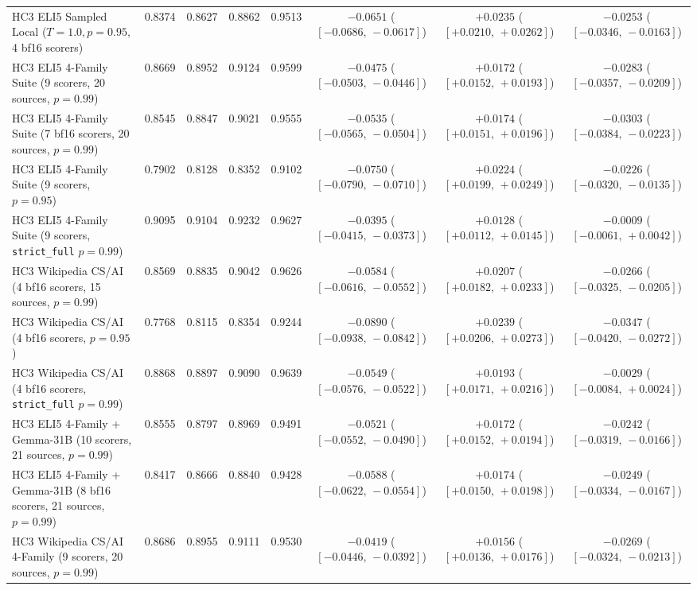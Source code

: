 \documentclass[11pt]{article}
\begin{document}
\begin{table}[t]
{\begin{tabular}{lccccccc}
HC3 ELI5 Sampled Local ($T=1.0, p=0.95$, 4 bf16 scorers) & 0.8374 & 0.8627 & 0.8862 & 0.9513 & $-0.0651$ ($[-0.0686,\,-0.0617]$) & $+0.0235$ ($[+0.0210,\,+0.0262]$) & $-0.0253$ ($[-0.0346,\,-0.0163]$) \\
HC3 ELI5 4-Family Suite (9 scorers, 20 sources, $p=0.99$) & 0.8669 & 0.8952 & 0.9124 & 0.9599 & $-0.0475$ ($[-0.0503,\,-0.0446]$) & $+0.0172$ ($[+0.0152,\,+0.0193]$) & $-0.0283$ ($[-0.0357,\,-0.0209]$) \\
HC3 ELI5 4-Family Suite (7 bf16 scorers, 20 sources, $p=0.99$) & 0.8545 & 0.8847 & 0.9021 & 0.9555 & $-0.0535$ ($[-0.0565,\,-0.0504]$) & $+0.0174$ ($[+0.0151,\,+0.0196]$) & $-0.0303$ ($[-0.0384,\,-0.0223]$) \\
HC3 ELI5 4-Family Suite (9 scorers, $p=0.95$) & 0.7902 & 0.8128 & 0.8352 & 0.9102 & $-0.0750$ ($[-0.0790,\,-0.0710]$) & $+0.0224$ ($[+0.0199,\,+0.0249]$) & $-0.0226$ ($[-0.0320,\,-0.0135]$) \\
HC3 ELI5 4-Family Suite (9 scorers, \texttt{strict\_full} $p=0.99$) & 0.9095 & 0.9104 & 0.9232 & 0.9627 & $-0.0395$ ($[-0.0415,\,-0.0373]$) & $+0.0128$ ($[+0.0112,\,+0.0145]$) & $-0.0009$ ($[-0.0061,\,+0.0042]$) \\
HC3 Wikipedia CS/AI (4 bf16 scorers, 15 sources, $p=0.99$) & 0.8569 & 0.8835 & 0.9042 & 0.9626 & $-0.0584$ ($[-0.0616,\,-0.0552]$) & $+0.0207$ ($[+0.0182,\,+0.0233]$) & $-0.0266$ ($[-0.0325,\,-0.0205]$) \\
HC3 Wikipedia CS/AI (4 bf16 scorers, $p=0.95$) & 0.7768 & 0.8115 & 0.8354 & 0.9244 & $-0.0890$ ($[-0.0938,\,-0.0842]$) & $+0.0239$ ($[+0.0206,\,+0.0273]$) & $-0.0347$ ($[-0.0420,\,-0.0272]$) \\
HC3 Wikipedia CS/AI (4 bf16 scorers, \texttt{strict\_full} $p=0.99$) & 0.8868 & 0.8897 & 0.9090 & 0.9639 & $-0.0549$ ($[-0.0576,\,-0.0522]$) & $+0.0193$ ($[+0.0171,\,+0.0216]$) & $-0.0029$ ($[-0.0084,\,+0.0024]$) \\
HC3 ELI5 4-Family + Gemma-31B (10 scorers, 21 sources, $p=0.99$) & 0.8555 & 0.8797 & 0.8969 & 0.9491 & $-0.0521$ ($[-0.0552,\,-0.0490]$) & $+0.0172$ ($[+0.0152,\,+0.0194]$) & $-0.0242$ ($[-0.0319,\,-0.0166]$) \\
HC3 ELI5 4-Family + Gemma-31B (8 bf16 scorers, 21 sources, $p=0.99$) & 0.8417 & 0.8666 & 0.8840 & 0.9428 & $-0.0588$ ($[-0.0622,\,-0.0554]$) & $+0.0174$ ($[+0.0150,\,+0.0198]$) & $-0.0249$ ($[-0.0334,\,-0.0167]$) \\
HC3 Wikipedia CS/AI 4-Family (9 scorers, 20 sources, $p=0.99$) & 0.8686 & 0.8955 & 0.9111 & 0.9530 & $-0.0419$ ($[-0.0446,\,-0.0392]$) & $+0.0156$ ($[+0.0136,\,+0.0176]$) & $-0.0269$ ($[-0.0324,\,-0.0213]$) \\

\end{tabular}}
\end{table}
\end{document}
